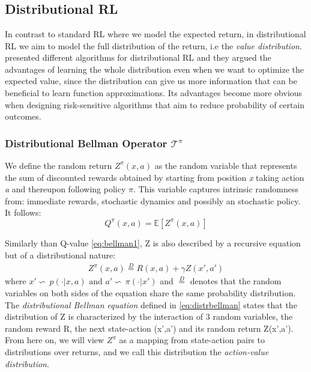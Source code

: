 \chapter{}\label{chap:appendix_distRL}
\section{Distributional RL} 

In contrast to standard RL where we model the expected return, in distributional RL we aim
to model the full distribution of the return, i.e the \textit{value distribution}.
\citet{Bellemare2017,Dabney2018a,Dabney2018b} presented different algorithms for distributional RL
and they argued the advantages of learning the whole distribution
even when we want to optimize the expected value, since the distribution can give us more information that
can be beneficial to learn function approximations.
Its advantages become more obvious when designing risk-sensitive algorithms that aim 
to reduce probability of
certain outcomes.

\subsection{Distributional Bellman Operator \texorpdfstring{$\mathcal{T}^\pi$}{}}

We define the random return $Z^\pi(x,a)$ as the random variable that represents the sum
of discounted rewards
obtained by 
starting from position \textit{x} taking action \textit{a} and thereupon following
policy $\pi$.
This variable captures intrinsic randomness from: immediate rewards, stochastic dynamics
and possibly an stochastic policy.
It follows:
\begin{equation}
    Q^\pi(x,a) = \mathbb E[Z^\pi(x,a)]
\end{equation}

Similarly than Q-value \ref{eq:bellman1}, Z is also described by a recursive equation
but of a distributional nature: 
\begin{eqnarray}
    Z^\pi(x,a) \stackrel{D}{=} R(x,a) + \gamma Z(x',a') \label{eq:distrbellman}
\end{eqnarray}
where $x'\backsim\ p(\cdot|x,a) \text{ and } a' \backsim\ \pi(\cdot |x')$ and $\stackrel{D}{=}$ 
denotes that the random variables on both sides of the equation share the same
probability distribution.\\
The \textit{distributional Bellman equation} defined in \eqref{eq:distrbellman} states
that the distribution of 
Z is characterized by the interaction of 3 random variables, the random reward R, the next
state-action (x',a') and its random return 
Z(x',a'). From here on, we will view $Z^\pi$ as a mapping from state-action pairs to
distributions over
returns, and we call this distribution the \textit{action-value distribution}.

